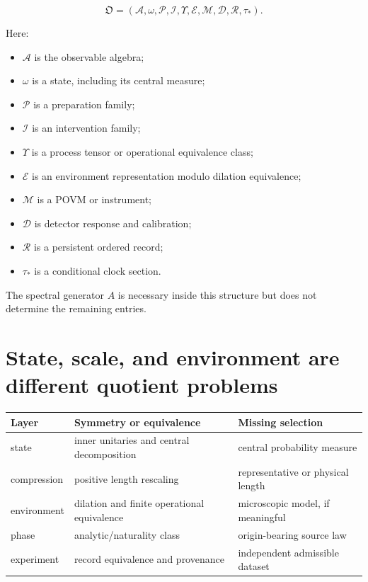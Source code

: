 \documentclass[11pt,a4paper,openany]{report}
\begin{document}
\[
\mathfrak O
=
(\mathcal A,\omega,\mathcal P,\mathcal I,\Upsilon,
\mathcal E,\mathcal M,\mathcal D,\mathcal R,\tau_\ast).
\]

Here:

\begin{itemize}
\item 
\(\mathcal A\) is the observable algebra;

\item 
\(\omega\) is a state, including its central measure;

\item 
\(\mathcal P\) is a preparation family;

\item 
\(\mathcal I\) is an intervention family;

\item 
\(\Upsilon\) is a process tensor or operational equivalence class;

\item 
\(\mathcal E\) is an environment representation modulo dilation equivalence;

\item 
\(\mathcal M\) is a POVM or instrument;

\item 
\(\mathcal D\) is detector response and calibration;

\item 
\(\mathcal R\) is a persistent ordered record;

\item 
\(\tau_\ast\) is a conditional clock section.

\end{itemize}

The spectral generator \(A\) is necessary inside this structure but does not determine the remaining entries.

\section{State, scale, and environment are different quotient problems}

\begin{center}
\begingroup\small
\setlength{\tabcolsep}{3.5pt}
\renewcommand{\arraystretch}{1.16}
\begin{longtable}{@{}p{}p{}p{}@{}}
\toprule
\textbf{Layer} & \textbf{Symmetry or equivalence} & \textbf{Missing selection} \\
\midrule
\endhead
state & inner unitaries and central decomposition & central probability measure \\
compression & positive length rescaling & representative or physical length \\
environment & dilation and finite operational equivalence & microscopic model, if meaningful \\
phase & analytic/\allowbreak{}naturality class & origin-bearing source law \\
experiment & record equivalence and provenance & independent admissible dataset \\
\bottomrule
\end{longtable}
\endgroup
\end{center}
\end{document}
